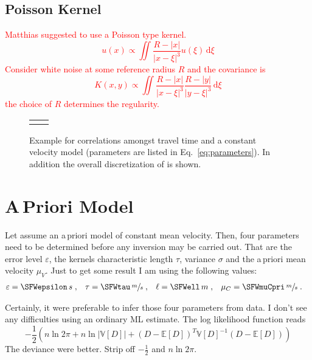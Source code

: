 \documentclass[11pt]{article}
\newcommand\worries[1]{\textcolor{red}{#1}}
\newcommand\Mean[1]{\mathbb{E}\!\left[#1\right]}
\newcommand\Var[1]{\mathbb{V}\!\left[#1\right]}
\begin{document}
\subsection{Poisson Kernel}
\worries{Matthias suggested to use a Poisson type kernel.
\begin{equation}
    u(x) \propto \iint \frac{R-|x|}{|x-\xi|^3} u(\xi) \, \mathrm d \xi
\end{equation}
Consider white noise at some reference radius $R$ and the covariance is
\begin{equation}
    K(x,y) \propto \iint \frac{R-|x|}{|x-\xi|^3} \frac{R-|y|}{|y-\xi|^3} \, \mathrm d \xi
\end{equation}
the choice of $R$ determines the regularity. }

\begin{figure}
    \centering
    \begin{tabular}{p{}p{}}
    \vspace{0pt}  &
    \vspace{0pt} 
    \end{tabular}
    \caption{Example for correlations amongst travel time and a constant velocity model (parameters are listed in Eq.~\ref{eq:parameters}).
        In addition the overall discretization of is shown. }
    \label{fig:correlation}
\end{figure}


\section{A\,Priori Model}

Let assume an a\,priori model of constant mean velocity.
Then, four parameters need to be determined before any inversion may be carried out.
That are the error level $\varepsilon$, the kernels characteristic length $\tau$, variance $\sigma$ and the a\,priori mean velocity $\mu_V$.
Just to get some result I am using the following values:
\begin{align}\label{eq:parameters}
    \varepsilon &= \SFWepsilon \, s \;,&
    \tau &= \SFWtau \, \sfrac ms \;,&
    \ell &= \SFWell \, m \;,&
    \mu_C &= \SFWmuCpri \, \sfrac ms \;.
\end{align}

Certainly, it were preferable to infer those four parameters from data.
I don't see any difficulties using an ordinary ML estimate.
The log likelihood function reads
\begin{equation}
    -\frac 12 \left( n \ln 2\pi + n \ln |\Var D| + (D - \Mean D)^T \Var{D}^{-1} (D - \Mean D) \right)
\end{equation}
The deviance were better. Strip off $-\frac12$ and $n\ln2\pi$.
\end{document}
